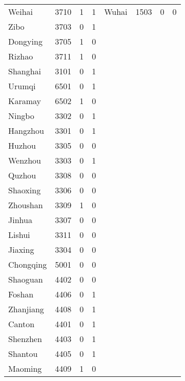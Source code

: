 \documentclass[12pt]{article}
\begin{document}
\begin{table}[!htb]
\begin{adjustbox}{width=\textwidth, totalheight=\baselineskip,keepaspectratio}
\begin{tabular}{llrlllrl}
    Weihai &  3710 &    1 &   1 &         Wuhai &  1503 &    0 &   0 \\
      Zibo &  3703 &    0 &   1 &              &      &     &    \\
  Dongying &  3705 &    1 &   0 &              &      &     &    \\
    Rizhao &  3711 &    1 &   0 &              &      &     &    \\
  Shanghai &  3101 &    0 &   1 &              &      &     &    \\
    Urumqi &  6501 &    0 &   1 &              &      &     &    \\
   Karamay &  6502 &    1 &   0 &              &      &     &    \\
    Ningbo &  3302 &    0 &   1 &              &      &     &    \\
  Hangzhou &  3301 &    0 &   1 &              &      &     &    \\
    Huzhou &  3305 &    0 &   0 &              &      &     &    \\
   Wenzhou &  3303 &    0 &   1 &              &      &     &    \\
    Quzhou &  3308 &    0 &   0 &              &      &     &    \\
  Shaoxing &  3306 &    0 &   0 &              &      &     &    \\
  Zhoushan &  3309 &    1 &   0 &              &      &     &    \\
    Jinhua &  3307 &    0 &   0 &              &      &     &    \\
    Lishui &  3311 &    0 &   0 &              &      &     &    \\
   Jiaxing &  3304 &    0 &   0 &              &      &     &    \\
 Chongqing &  5001 &    0 &   0 &              &      &     &    \\
  Shaoguan &  4402 &    0 &   0 &              &      &     &    \\
    Foshan &  4406 &    0 &   1 &              &      &     &    \\
 Zhanjiang &  4408 &    0 &   1 &              &      &     &    \\
    Canton &  4401 &    0 &   1 &              &      &     &    \\
  Shenzhen &  4403 &    0 &   1 &              &      &     &    \\
   Shantou &  4405 &    0 &   1 &              &      &     &    \\
   Maoming &  4409 &    1 &   0 &              &      &     &    \\

\end{tabular}
\end{adjustbox}
\end{table}
\end{document}
